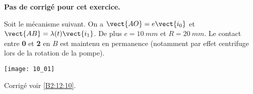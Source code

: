 \normalfalse \difficiletrue \tdifficilefalse
\correctionfalse


\setcounter{numques}{0}
\ifcorrection
\else
\textbf{Pas de corrigé pour cet exercice.}
\fi

\ifprof
\else
Soit le mécanisme suivant. On a $\vect{AO}=e\vect{i_0}$ et $\vect{AB}=\lambda(t)\vect{i_1}$. De plus $e=\SI{10}{mm}$ et $R=\SI{20}{mm}$. Le contact entre \textbf{0} et \textbf{2} en $B$ est maintenu en permanence (notamment par effet centrifuge lors de la rotation de la pompe).
\begin{center}
\texttt{[image: 10\_01]}
\end{center}
\fi


\ifprof
\else
\fi


\ifprof
\else
\fi

\ifprof
\else
\fi


\ifprof
\else
\fi



\ifprof
\else
\begin{flushright}
\footnotesize{Corrigé  voir \ref{B2:12:10}.}
\end{flushright}%
\fi